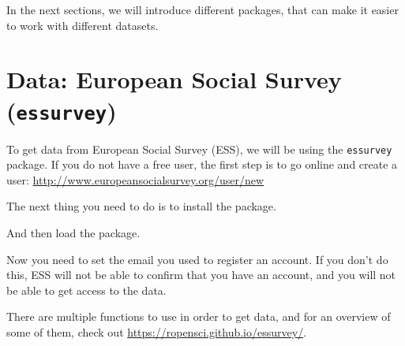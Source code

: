 \documentclass[12pt,oneside]{reedthesis}
\theoremstyle{definition}
\theoremstyle{definition}
\theoremstyle{definition}
\theoremstyle{remark}
\begin{document}
  In the next sections, we will introduce different packages, that can
  make it easier to work with different datasets.
  
  \section{\texorpdfstring{Data: European Social Survey
  (\texttt{essurvey})}{Data: European Social Survey (essurvey)}}\label{data-european-social-survey-essurvey}
  
  To get data from European Social Survey (ESS), we will be using the
  \texttt{essurvey} package. If you do not have a free user, the first
  step is to go online and create a user:
  \url{http://www.europeansocialsurvey.org/user/new}
  
  The next thing you need to do is to install the package.
  \begin{Shaded}
  \begin{Highlighting}[]
  \NormalTok{(}\NormalTok{)}
  \end{Highlighting}
  \end{Shaded}
  And then load the package.
  \begin{Shaded}
  \begin{Highlighting}[]
  \NormalTok{(}\NormalTok{)}
  \end{Highlighting}
  \end{Shaded}
  Now you need to set the email you used to register an account. If you
  don't do this, ESS will not be able to confirm that you have an account,
  and you will not be able to get access to the data.
  \begin{Shaded}
  \begin{Highlighting}[]
  \NormalTok{(}\NormalTok{)}
  \end{Highlighting}
  \end{Shaded}
  There are multiple functions to use in order to get data, and for an
  overview of some of them, check out
  \url{https://ropensci.github.io/essurvey/}.
  
\end{document}
